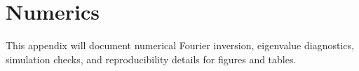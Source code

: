 \section{Numerics}

This appendix will document numerical Fourier inversion, eigenvalue diagnostics, simulation checks, and reproducibility details for figures and tables.

